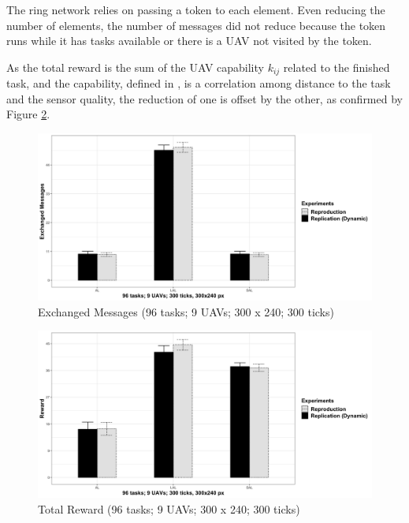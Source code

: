 The ring network relies on passing a token to each element. Even reducing the number of elements, the number of messages did not reduce because the token runs while it has tasks available or there is a UAV not visited by the token.

As the total reward is the sum of the UAV capability $k_{ij}$ related to the finished task, and the capability, defined in \cite{MAS07}, is a correlation among distance to the task and the sensor quality, the reduction of one is offset by the other, as confirmed by Figure \ref{fig:fig02}.

\begin{figure}[h!]
	\begin{center}
		\includegraphics[scale=0.15]{fig/GRAPH03.png}
		\caption{Exchanged Messages  (96 tasks; 9 UAVs; 300 x 240; 300 ticks)}
		\label{fig:fig01}
	\end{center}
\end{figure}

\begin{figure}[h!]
	\begin{center}
		\includegraphics[scale=0.15]{fig/GRAPH04.png}
		\caption{Total Reward (96 tasks; 9 UAVs; 300 x 240; 300 ticks)}
		\label{fig:fig02}
	\end{center}
\end{figure}

